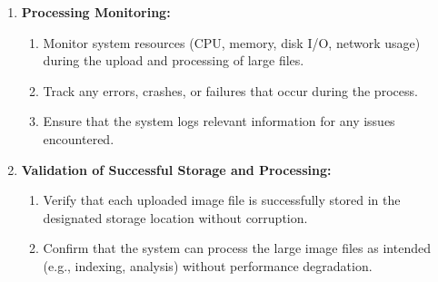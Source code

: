 \documentclass[12pt, titlepage]{article}
\begin{document}
\begin{enumerate}
\begin{enumerate}
    \item \textbf{Processing Monitoring:}
    \begin{enumerate}
        \item Monitor system resources (CPU, memory, disk I/O, network usage) during the upload and processing of large files.
        \item Track any errors, crashes, or failures that occur during the process.
        \item Ensure that the system logs relevant information for any issues encountered.
    \end{enumerate}
    
    \item \textbf{Validation of Successful Storage and Processing:}
    \begin{enumerate}
        \item Verify that each uploaded image file is successfully stored in the designated storage location without corruption.
        \item Confirm that the system can process the large image files as intended (e.g., indexing, analysis) without performance degradation.
    \end{enumerate}
    
\end{enumerate}

\end{enumerate}

\end{document}
